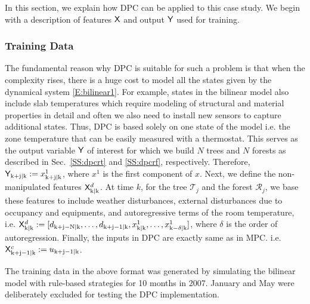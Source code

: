In this section, we explain how DPC can be applied to this case study. We begin with a description of features $\mathsf{X}$ and output $\mathsf{Y}$ used for training.

\subsubsection{Training Data} 
\label{SSS:dpc_data}

The fundamental reason why DPC  is suitable for such a problem is that when the complexity rises, there is a huge cost to model all the states given by the dynamical system \eqref{E:bilinear1}. For example, states in the bilinear model also include slab temperatures which require modeling of structural and material properties in detail and often we also need to install new sensors to capture additional states. Thus, DPC is based solely on one state of the model i.e. the zone temperature that can be easily measured with a thermostat. This serves as the output variable $\mathsf{Y}$ of interest for which we build $N$ trees and $N$ forests as described in Sec.~\ref{SS:dpcrt} and \ref{SS:dpcrf}, respectively. Therefore, $\mathsf{Y}_{\mathrm{k+j|k}}:=x_{\mathrm{k+j|k}}^1$, where $x^1$ is the first component of $x$.
Next, we define the non-manipulated features $\mathsf{X}^d_{\mathrm{k|k}}$. At time $k$, for the tree $\mathcal{T}_j$ and the forest $\mathcal{R}_j$, we base these features to include weather disturbances, external disturbances due to occupancy and equipments, and autoregressive terms of the room temperature, i.e.
$\mathsf{X}^d_{\mathrm{k|k}}:=[ d_{\mathrm{k+j-N|k}} ,\dots,d_{\mathrm{k+j-1|k}}, x_{\mathrm{k|k}}^1,\dots, x_{\mathrm{k-\delta|k}}^1 ]$, where $\delta$ is the order of autoregression.
Finally, the inputs in DPC are exactly same as in MPC. i.e. $\mathsf{X}^c_{\mathrm{k+j-1|k}}:=u_{\mathrm{k+j-1|k}}$.

The training data in the above format was generated by simulating the bilinear model with rule-based strategies for 10 months in 2007. January and May were deliberately excluded for testing the DPC implementation.


